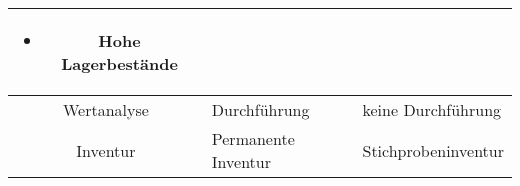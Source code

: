\documentclass{article}
\begin{document}
\begin{enumerate}[label=(\alph*)]
\begin{center}
\begin{longtable}{c|C{5cm}|C{5cm}}
\begin{itemize}[nosep, before=\vspace{-\baselineskip}, after=\vspace{-\baselineskip}, leftmargin=0.3cm]
					\item Hohe Lagerbestände
				\end{itemize} \\
				\hline
				Wertanalyse & Durchführung & keine Durchführung \\
				\hline
				Inventur & Permanente Inventur & Stichprobeninventur
			\end{longtable}
		\end{center}
	\end{enumerate}
	
	
\end{document}
